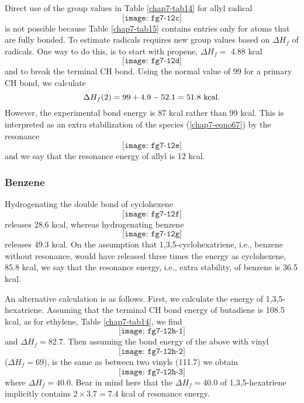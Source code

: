 Direct use of the group values in Table \ref{chap7-tab14} for allyl
radical
\begin{equation}
\texttt{[image: fg7-12c]}
\label{chap7-eqno67}
\end{equation}
is not possible because Table \ref{chap7-tab15} contains entries only
for atoms that are fully bonded.  To estimate radicals requires new
group values based on $\Delta H_f$ of radicals.  One way to do this,
is to start with propene, $\Delta H_f =$ 4.88 kcal
\begin{equation}
\texttt{[image: fg7-12d]}
\end{equation}
and to break the terminal CH bond.  Using the normal value of 99 
for a primary CH bond, we calculate
\begin{equation}
\Delta H_f (2) = 99 + 4.9 - 52.1 = 51.8 ~ {\rm kcal}.
\end{equation}
However, the experimental bond energy is 87 kcal rather than 99
kcal. This is interpreted as an extra stabilization of the species
(\ref{chap7-eqno67}) by the resonance
\begin{equation}
\texttt{[image: fg7-12e]}
\end{equation}
and we say that the resonance energy of allyl is 12 kcal.

\subsubsection{Benzene}

Hydrogenating the double bond of cyclohexene
\begin{equation}
\texttt{[image: fg7-12f]}
\end{equation}
releases 28.6 kcal, whereas hydrogenating benzene
\begin{equation}
\texttt{[image: fg7-12g]}
\end{equation}
releases 49.3 kcal.  On the assumption that 1,3,5-cyclohexatriene,
i.e., benzene without resonance, would have released three times 
the energy as cyclohexene, 85.8 kcal, we say that the resonance 
energy, i.e., extra stability, of benzene is 36.5 kcal.

An alternative calculation is as follows.  First, we calculate the
energy of 1,3,5-hexatriene.  Assuming that the terminal CH bond energy
of butadiene is 108.5 kcal, as for ethylene, Table \ref{chap7-tab14},
we find
\begin{equation}
\texttt{[image: fg7-12h-1]}
\end{equation}
and $\Delta H_f = 82.7$.
Then assuming the bond energy of the above with vinyl
\begin{equation}
\texttt{[image: fg7-12h-2]}
\end{equation}
($\Delta H_f = 69$),
is the same as between two vinyls (111.7) we obtain
\begin{equation}
\texttt{[image: fg7-12h-3]}
\end{equation}
where $\Delta H_f = 40.0$.
Bear in mind here that the $\Delta H_f = 40.0$ of 1,3,5-hexatriene 
implicitly contains $2 \times 3.7 = 7.4$ kcal of resonance 
energy.


